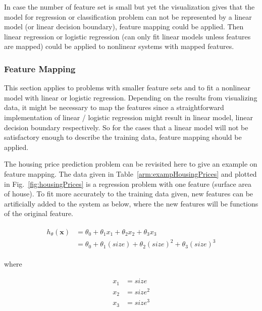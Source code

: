 In case the number of feature set is small but yet the visualization gives that the model for regression or classification problem can not be represented by a linear model (or linear decision boundary), feature mapping could be applied. 
Then linear regression or logistic regression (can only fit linear models unless features are mapped) could be applied to nonlinear systems with mapped features.  

\subsubsection{Feature Mapping}

This section applies to problems with smaller feature sets and to fit a nonlinear model with linear or logistic regression.
Depending on the results from visualizing data, it might be necessary to map the features since a straightforward implementation of linear / logistic regression might result in linear model, linear decision boundary respectively. 
So for the cases that a linear model will not be satisfactory enough to describe the training data, feature mapping should be applied.

The housing price prediction problem can be revisited here to give an example on feature mapping.
The data given in Table~\ref{arm:exampHousingPrices} and plotted in Fig.~\ref{fig:housingPrices} is a regression problem with one feature (surface area of house).
To fit more accurately to the training data given, new features can be artificially added to the system as below, where the new features will be functions of the original feature.

\begin{align}
\label{eqn:costFuncExamp1}
\begin{split}
h_{\theta}(\bm{x}) & = \theta_0 + \theta_1 x_1 + \theta_2 x_2 + \theta_3 x_3
\\
& = \theta_0 + \theta_1 (size) + \theta_2 {(size)}^2 + \theta_3 {(size)}^3
\end{split}
\end{align}

where

\begin{align}
\label{eqn:featureMapping1}
\begin{split}
x_1 & = size
\\
x_2 & = size^2
\\
x_3 & = size^3
\end{split}
\end{align}

